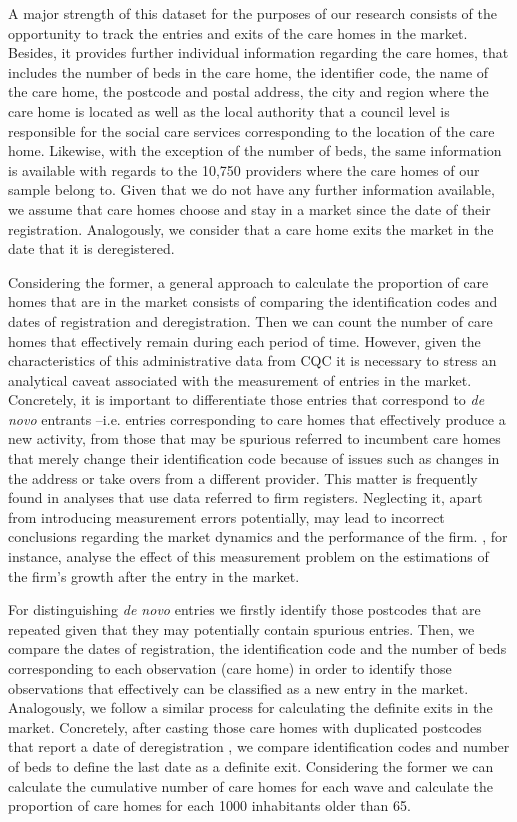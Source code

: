 \documentclass[12pt,letterpaper]{article}
\begin{document}
A major strength of this dataset for the purposes of our research consists of the opportunity 
to track the entries and exits of the care homes in the market. Besides, it provides further
 individual information regarding the care homes, that includes 
the number of beds in the care home, the identifier code, the name of the care home, the postcode and postal 
address, the city and region where the care home is located as well as the local authority that a council level is responsible for the 
social care services corresponding to the location of the care home. Likewise, with the exception of the number of
 beds, the same information is available with regards to the 10,750 providers where the care homes of our sample 
 belong to. Given that we do not have any further information available, we assume that care homes 
choose and stay in a market since the date of their registration. 
Analogously, we consider that a care home exits the market in the date that it is deregistered.

Considering the former, a general approach to calculate the proportion of care homes
 that are in the market consists of comparing the identification codes and dates of
  registration and deregistration. Then we can count the number of care homes that
   effectively remain during each period of time. However, given the characteristics of this
    administrative data from CQC it is necessary to stress an analytical caveat associated 
    with the measurement of entries in the market. Concretely, it is important to differentiate 
    those entries that correspond to \textit{ de novo } entrants –i.e. entries corresponding to 
    care homes that effectively produce a new activity, from those that may be spurious referred to incumbent
      care homes that merely change their identification code because of 
      issues such as changes in the address or take overs from a different provider. 
      This matter is frequently found in analyses that use data referred to firm
      registers. Neglecting it, apart from introducing measurement errors potentially,
       may lead to incorrect conclusions regarding the market dynamics and 
      the performance of the firm. \citet{geurts2016firm}, for instance, analyse the effect of this measurement
          problem on the estimations of the firm’s growth after the entry in the market.

For distinguishing \textit{de novo} entries we firstly identify those postcodes
 that are repeated given that they may potentially contain spurious entries.
  Then, we compare the dates of registration, the identification code and
   the number of beds corresponding to each observation (care home)
    in order to identify those observations that effectively can be classified 
    as a new entry in the market. Analogously, we follow a similar process
     for calculating the definite exits in the market.  Concretely, 
     after casting those care homes with duplicated postcodes that
      report a date of deregistration , we compare identification
       codes and number of beds to define the last date as a
        definite exit. Considering the former we can calculate 
        the cumulative number of care homes for each wave and 
        calculate the proportion of care homes for each 1000 inhabitants older than 65.   
\end{document}
